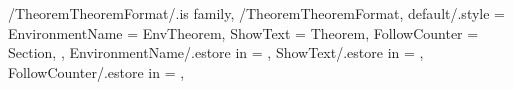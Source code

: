 \newcommand{\MappingTheoremCounter}[2][\empty]
{%
  \ifthenelse{\equal{#2}{Section}}%
  {%
    \MappingTheoremCounterResetCounter[#1]{section}%
  }{}%
  \ifthenelse{\equal{#2}{Definition}}%
  {%
    \MappingTheoremCounterResetCounter[#1]{%
      \GetTheoremDefinitionFormatFollowCounter}%
  }{}%
  \ifthenelse{\equal{#2}{Condition}}%
  {%
    \MappingTheoremCounterResetCounter[#1]{%
      \GetTheoremConditionFormatFollowCounter}%
  }{}%
  \ifthenelse{\equal{#2}{Theorem}}%
  {%
    \MappingTheoremCounterResetCounter[#1]{%
      \GetTheoremTheoremFormatFollowCounter}%
  }{}%
  \ifthenelse{\equal{#2}{Lemma}}%
  {%
    \MappingTheoremCounterResetCounter[#1]{%
      \GetTheoremLemmaFormatFollowCounter}%
  }{}%
  \ifthenelse{\equal{#2}{Example}}%
  {%
    \MappingTheoremCounterResetCounter[#1]{%
      \GetTheoremExampleFormatFollowCounter}%
  }{}%
  \ifthenelse{\equal{#2}{Corollary}}%
  {%
    \MappingTheoremCounterResetCounter[#1]{%
      \GetTheoremCorollaryFormatFollowCounter}%
  }{}%
  \ifthenelse{\equal{#2}{Proposition}}%
  {%
    \MappingTheoremCounterResetCounter[#1]{%
      \GetTheoremPropositionFormatFollowCounter}%
  }{}%
  \ifthenelse{\equal{#2}{Conjectures}}%
  {%
    \MappingTheoremCounterResetCounter[#1]{%
      \GetTheoremConjecturesFormatFollowCounter}%
  }{}%
  \ifthenelse{\equal{#2}{Criterion}}%
  {%
    \MappingTheoremCounterResetCounter[#1]{%
      \GetTheoremCriterionFormatFollowCounter}%
  }{}%
  \ifthenelse{\equal{#2}{Assertion}}%
  {%
    \MappingTheoremCounterResetCounter[#1]{%
      \GetTheoremAssertionFormatFollowCounter}%
  }{}%
  \ifthenelse{\equal{#2}{Question}}%
  {%
    \MappingTheoremCounterResetCounter[#1]{%
      \GetTheoremQuestionFormatFollowCounter}%
  }{}%
  \ifthenelse{\equal{#2}{Hypothesis}}%
  {%
    \MappingTheoremCounterResetCounter[#1]{%
      \GetTheoremHypothesisFormatFollowCounter}%
  }{}%
} %


\pgfkeys
{
  /TheoremTheoremFormat/.is family, /TheoremTheoremFormat,
  default/.style =
  {
    EnvironmentName = {EnvTheorem},
    ShowText = {Theorem},
    FollowCounter = Section,
  },
  EnvironmentName/.estore in = \GetTheoremTheoremFormatEnvironmentName,
  ShowText/.estore in = \GetTheoremTheoremFormatShowText,
  FollowCounter/.estore in = \GetTheoremTheoremFormatFollowCounter,
} %

\newcommand{\InsertTheorem}[2][\empty]
{%
  \InsertTheoremContent[#1]{\GetTheoremTheoremFormatEnvironmentName}{#2}%
} %

